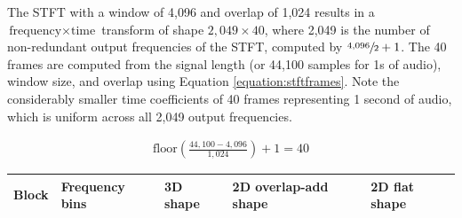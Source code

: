 \documentclass[report.tex]{subfiles}
\begin{document}
The STFT with a window of 4,096 and overlap of 1,024 results in a $\text{frequency} \times \text{time}$ transform of shape $2{,}049 \times 40$, where 2,049 is the number of non-redundant output frequencies of the STFT, computed by $\sfrac{4{,}096}{2} + 1$. The 40 frames are computed from the signal length (or 44,100 samples for 1s of audio), window size, and overlap using Equation \ref{equation:stftframes}. Note the considerably smaller time coefficients of 40 frames representing 1 second of audio, which is uniform across all 2,049 output frequencies.

\begin{align}
\text{floor}(\frac{44{,}100-4{,}096}{1{,}024}) + 1 = 40
\end{align}

\begin{table}[ht]
	\centering
	\begin{tabular}{ |l|l|l|l|l| }
	 \hline
		Block & Frequency bins & 3D shape & 2D overlap-add shape & 2D flat shape \\
	 \hline
	 \hline


\end{tabular}
\end{table}
\end{document}
